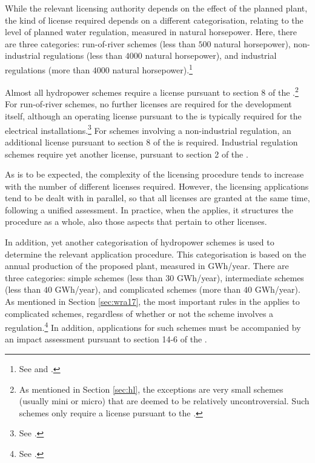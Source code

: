 While the relevant licensing authority depends on the effect of the planned plant, the kind of license required depends on a different categorisation, relating to the level of planned water regulation, measured in natural horsepower. Here, there are three categories: run-of-river schemes  (less than $500$ natural horsepower), non-industrial regulations (less than $4000$ natural horsepower), and industrial regulations (more than $4000$ natural horsepower).\footnote{See \cite[2]{wra17} and \cite[1,2]{ica17}.} %

Almost all hydropower schemes require a license pursuant to section 8 of the \cite{wra00}.\footnote{As mentioned in Section \ref{sec:hl}, the exceptions are very small schemes (usually mini or micro) that are deemed to be relatively uncontroversial. Such schemes only require a license pursuant to the \cite{pb08}.} For run-of-river schemes, no further licenses are required for the development itself, although an operating license pursuant to the \cite{ea90} is typically required for the electrical installations.\footnote{See \cite[3-1]{ea90}.} For schemes involving a non-industrial regulation, an additional license pursuant to section 8 of the \cite{wra17} is required. Industrial regulation schemes require yet another license, pursuant to section 2 of the \cite{ica17}.

As is to be expected, the complexity of the licensing procedure tends to increase with the number of different licenses required. However, the licensing applications tend to be dealt with in parallel, so that all licenses are granted at the same time, following a unified assessment. In practice, when the \cite{wra17} applies, it structures the procedure as a whole, also those aspects that pertain to other licenses. 

In addition, yet another categorisation of hydropower schemes is used to determine the relevant application procedure. This categorisation is based on the annual production of the proposed plant, measured in GWh/year. There are three categories: simple schemes (less than $30$ GWh/year), intermediate schemes (less than $40$ GWh/year), and complicated schemes (more than $40$ GWh/year). As mentioned in Section \ref{sec:wra17}, the most important rules in the \cite{wra17} applies to complicated schemes, regardless of whether or not the scheme involves a regulation.\footnote{See \cite[19]{wra00}.} In addition, applications for such schemes must be accompanied by an impact assessment pursuant to section 14-6 of the \cite{pb08}.

